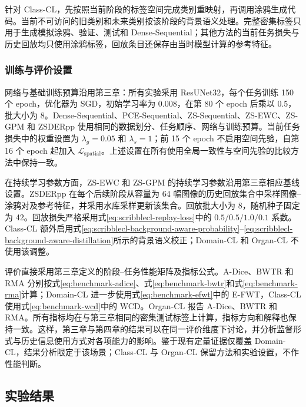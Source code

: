 针对 Class-CL，先按照当前阶段的标签空间完成类别重映射，再调用涂鸦生成代码。当前不可访问的旧类别和未来类别按该阶段的背景语义处理。完整密集标签只用于生成模拟涂鸦、验证、测试和 Dense-Sequential；其他方法的当前任务损失与历史回放均只使用涂鸦标签，回放条目还保存由当时模型计算的参考特征。

\subsubsection{训练与评价设置}
\label{subsubsec:scribblecl-training-evaluation}

网络与基础训练预算沿用第三章：所有实验采用 ResUNet32，每个任务训练 150 个 epoch，优化器为 SGD，初始学习率为 0.008，在第 80 个 epoch 后乘以 0.5，批大小为 8。Dense-Sequential、PCE-Sequential、ZS-Sequential、ZS-EWC、ZS-GPM 和 ZSDERpp 使用相同的数据划分、任务顺序、网络与训练预算。当前任务损失中的权重设置为 $\lambda_g=0.05$ 和 $\lambda_s=1$；前 15 个 epoch 不启用空间先验，自第 16 个 epoch 起加入 $\mathcal{L}_{\mathrm{spatial}}$。上述设置在所有使用全局一致性与空间先验的比较方法中保持一致\cite{zhang2026zscribbleseg}。

在持续学习参数方面，ZS-EWC 和 ZS-GPM 的持续学习参数沿用第三章相应基线设置\cite{kirkpatrick2017ewc,saha2021gpm}。ZSDERpp 在每个后续阶段从容量为 64 幅图像的历史回放集合中采样图像--涂鸦对及参考特征，并采用水库采样更新该集合。回放批大小为 8，随机种子固定为 42。回放损失严格采用式\eqref{eq:scribblecl-replay-loss}中的 $0.5/0.5/1.0/0.1$ 系数。Class-CL 额外启用式\eqref{eq:scribblecl-background-aware-probability}--\eqref{eq:scribblecl-background-aware-distillation}所示的背景语义校正；Domain-CL 和 Organ-CL 不使用该调整。

评价直接采用第三章定义的阶段--任务性能矩阵及指标公式。A-Dice、BWTR 和 RMA 分别按式\eqref{eq:benchmark-adice}、式\eqref{eq:benchmark-bwtr}和式\eqref{eq:benchmark-rma}计算；Domain-CL 进一步使用式\eqref{eq:benchmark-efwt}中的 E-FWT，Class-CL 使用式\eqref{eq:benchmark-wcd}中的 WCD。Organ-CL 报告 A-Dice、BWTR 和 RMA。所有指标均在与第三章相同的密集测试标签上计算，指标方向和解释也保持一致。这样，第三章与第四章的结果可以在同一评价维度下讨论，并分析监督形式与历史信息使用方式对各项能力的影响。鉴于现有定量证据仅覆盖 Domain-CL，结果分析限定于该场景；Class-CL 与 Organ-CL 保留方法和实验设置，不作性能判断。

\subsection{实验结果}
\label{subsec:scribblecl-results}

